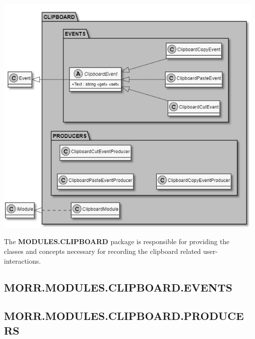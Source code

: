 \begin{center}
    \includegraphics[width=1.0\textwidth]{resources/Packages/MODULES_CLIPBOARD.png}
\end{center}

The \textbf{MODULES.CLIPBOARD} package is responsible for providing the classes and concepts necessary for recording the clipboard related user-interactions.

\begin{packclass}
\end{packclass}

\begin{packpack}
\end{packpack}

\subsection*{MORR.MODULES.CLIPBOARD.EVENTS}
\begin{packclass}
\end{packclass}

\subsection*{MORR.MODULES.CLIPBOARD.PRODUCERS}
\begin{packclass}
\end{packclass}




